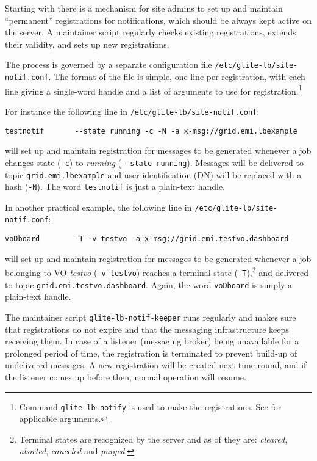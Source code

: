 Starting with  there is a mechanism for site admins to set up and maintain ``permanent'' registrations for notifications, which should be always kept active on the server. A maintainer script regularly checks existing registrations, extends their validity, and sets up new registrations.

The process is governed by a separate configuration file \texttt{/etc/glite-lb/site-notif.conf}. The format of the file is simple, one line per registration, with each line giving a single-word handle and a list of arguments to use for registration.\footnote{Command \texttt{glite-lb-notify} is used to make the registrations. See \cite{lbug} for applicable arguments.}

For instance the following line in \texttt{/etc/glite-lb/site-notif.conf}:

\begin{verbatim}
testnotif       --state running -c -N -a x-msg://grid.emi.lbexample
\end{verbatim}

\indent{}will set up and maintain registration for messages to be generated whenever a job changes state (\texttt{-c}) to \emph{running} (\texttt{-{}-state running}). Messages will be delivered to topic \texttt{grid.emi.lbexample} and user identification (DN) will be replaced with a hash (\texttt{-N}). The word \texttt{testnotif} is just a plain-text handle.

In another practical example, the following line in \texttt{/etc/glite-lb/site-notif.conf}:

\begin{verbatim}
voDboard        -T -v testvo -a x-msg://grid.emi.testvo.dashboard
\end{verbatim}

\indent{}will set up and maintain registration for messages to be generated whenever a job belonging to VO \emph{testvo} (\texttt{-v testvo}) reaches a terminal state (\texttt{-T}),\footnote{Terminal states are recognized by the server and as of  they are: \emph{cleared}, \emph{aborted}, \emph{canceled} and \emph{purged}.} and delivered to topic \texttt{grid.emi.testvo.dashboard}. Again, the word \texttt{voDboard} is simply a plain-text handle.

The maintainer script \texttt {glite-lb-notif-keeper} runs regularly and makes sure that registrations do not expire and that the messaging infrastructure keeps receiving them. In case of a listener (messaging broker) being unavailable for a prolonged period of time, the registration is terminated to prevent build-up of undelivered messages. A new registration will be created next time round, and if the listener comes up before then, normal operation will resume.

